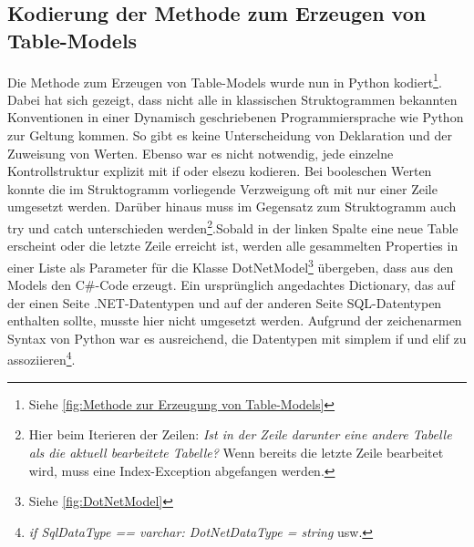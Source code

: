 \documentclass[11pt,toc=sectionentrywithoutdots, 
headheight=44pt, headings=optiontoheadandtoc, hyperfootnotes=false, hypertexnames=false]{scrartcl}
\newcommand\extendedref[1]{Siehe \ref{#1}}
\begin{document}
\subsection{Kodierung der Methode zum Erzeugen von Table-Models}
Die Methode zum Erzeugen von Table-Models wurde nun in Python kodiert\footnote{\extendedref{fig:Methode zur Erzeugung von Table-Models}}. Dabei hat sich gezeigt, dass nicht alle in klassischen Struktogrammen bekannten Konventionen in einer \gls{Dynamisch} geschriebenen Programmiersprache wie Python zur Geltung kommen. So gibt es keine Unterscheidung von Deklaration und der Zuweisung von Werten. Ebenso war es nicht notwendig, jede einzelne Kontrollstruktur explizit mit \glqq if\grqq{} oder \glqq else\grqq zu kodieren. Bei booleschen Werten konnte die im Struktogramm vorliegende Verzweigung oft mit nur einer Zeile umgesetzt werden. Darüber hinaus muss im Gegensatz zum Struktogramm auch \glqq try \grqq{} und \glqq catch \grqq{} unterschieden werden\footnote{Hier beim Iterieren der Zeilen: \textit{Ist in der Zeile darunter eine andere Tabelle als die aktuell bearbeitete Tabelle?} Wenn bereits die letzte Zeile bearbeitet wird, muss eine Index-Exception abgefangen werden.}.\newline Sobald in der linken Spalte eine neue Table erscheint oder die letzte Zeile erreicht ist, werden alle gesammelten Properties in einer Liste als Parameter für die Klasse \glqq DotNetModel\footnote{\extendedref{fig:DotNetModel}}\grqq{} übergeben, dass aus den Models den C\#-Code erzeugt. Ein ursprünglich angedachtes \gls{Dictionary}, das auf der einen Seite .NET-Datentypen und auf der anderen Seite SQL-Datentypen enthalten sollte, musste hier nicht umgesetzt werden. Aufgrund der zeichenarmen Syntax von Python war es ausreichend, die Datentypen mit simplem \glqq if \grqq{} und \glqq elif \grqq{} zu assoziieren\footnote{\textit{if SqlDataType == \grq varchar\grq{}: DotNetDataType = \grq string\grq{}} usw.}. 
\end{document}
